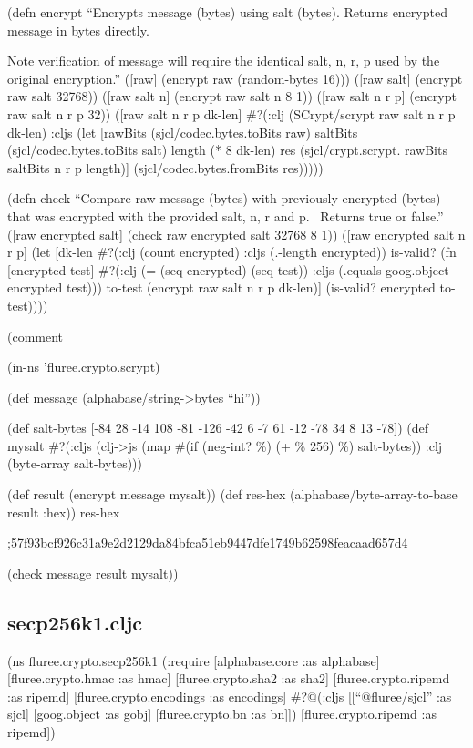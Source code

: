 \documentclass[
]{article}
\begin{document}
(defn encrypt ``Encrypts message (bytes) using salt (bytes). Returns
encrypted message in bytes directly.

Note verification of message will require the identical salt, n, r, p
used by the original encryption.'' ({[}raw{]} (encrypt raw (random-bytes
16))) ({[}raw salt{]} (encrypt raw salt 32768)) ({[}raw salt n{]}
(encrypt raw salt n 8 1)) ({[}raw salt n r p{]} (encrypt raw salt n r p
32)) ({[}raw salt n r p dk-len{]} \#?(:clj (SCrypt/scrypt raw salt n r p
dk-len) :cljs (let {[}rawBits (sjcl/codec.bytes.toBits raw) saltBits
(sjcl/codec.bytes.toBits salt) length (* 8 dk-len) res
(sjcl/crypt.scrypt. rawBits saltBits n r p length){]}
(sjcl/codec.bytes.fromBits res)))))

(defn check ``Compare raw message (bytes) with previously encrypted
(bytes) that was encrypted with the provided salt, n, r and p.~ Returns
true or false.'' ({[}raw encrypted salt{]} (check raw encrypted salt
32768 8 1)) ({[}raw encrypted salt n r p{]} (let {[}dk-len \#?(:clj
(count encrypted) :cljs (.-length encrypted)) is-valid? (fn {[}encrypted
test{]} \#?(:clj (= (seq encrypted) (seq test)) :cljs (.equals
goog.object encrypted test))) to-test (encrypt raw salt n r p dk-len){]}
(is-valid? encrypted to-test))))

(comment

(in-ns 'fluree.crypto.scrypt)

(def message (alphabase/string-\textgreater bytes ``hi''))

(def salt-bytes {[}-84 28 -14 108 -81 -126 -42 6 -7 61 -12 -78 34 8 13
-78{]}) (def mysalt \#?(:cljs (clj-\textgreater js (map \#(if (neg-int?
\%) (+ \% 256) \%) salt-bytes)) :clj (byte-array salt-bytes)))

(def result (encrypt message mysalt)) (def res-hex
(alphabase/byte-array-to-base result :hex)) res-hex

;57f93bcf926c31a9e2d2129da84bfca51eb9447dfe1749b62598feacaad657d4

(check message result mysalt))

\subsection{secp256k1.cljc}\label{secp256k1.cljc}

(ns fluree.crypto.secp256k1 (:require {[}alphabase.core :as alphabase{]}
{[}fluree.crypto.hmac :as hmac{]} {[}fluree.crypto.sha2 :as sha2{]}
{[}fluree.crypto.ripemd :as ripemd{]} {[}fluree.crypto.encodings :as
encodings{]} \#?@(:cljs {[}{[}``@fluree/sjcl'' :as sjcl{]}
{[}goog.object :as gobj{]} {[}fluree.crypto.bn :as bn{]}{]})
{[}fluree.crypto.ripemd :as ripemd{]})
\end{document}
